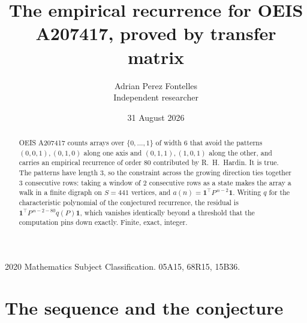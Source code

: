 \documentclass[11pt,a4paper]{article}
\title{The empirical recurrence for OEIS A207417, proved by transfer matrix}
\author{Adrian Perez Fontelles\\ \small Independent researcher}
\date{31 August 2026}
\theoremstyle{plain}
\theoremstyle{definition}
\begin{document}
\maketitle

\begin{abstract}
OEIS A207417 counts arrays over $\{0,\dots,1\}$ of width $6$ that avoid the patterns
$(0,0,1), (0,1,0)$ along one axis and $(0,1,1), (1,0,1)$ along the other, and carries an empirical recurrence of
order $80$ contributed by R.~H.~Hardin. It is true. The patterns have length $3$, so
the constraint across the growing direction ties together $3$ consecutive rows: taking a
window of $2$ consecutive rows as a state makes the array a walk in a finite digraph
on $S=441$ vertices, and $a(n)=\mathbf{1}^{\!\top}P^{\,n-2}\mathbf{1}$. Writing $q$
for the characteristic polynomial of the conjectured recurrence, the residual is
$\mathbf{1}^{\!\top}P^{\,n-2-80}q(P)\mathbf{1}$, which vanishes identically
beyond a threshold that the computation pins down exactly. Finite, exact, integer.
\end{abstract}

\noindent\small 2020 Mathematics Subject Classification. 05A15, 68R15, 15B36.\normalsize

\section{The sequence and the conjecture}
\end{document}
